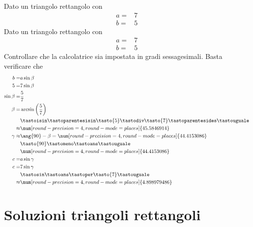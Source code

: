 \begin{exercise}
	Dato un triangolo rettangolo con
	\begin{align*}
	a=&7\\
	b=&5
	\end{align*}
	\tcblower
		Dato un triangolo rettangolo con
	\begin{align*}
	a=&7\\
	b=&5
	\end{align*}
	Controllare che la calcolatrice sia impostata in gradi sessagesimali.
	Basta verificare che \testgradi 
	\begin{align*}
	b=&a\sin\beta\\
	5=&7\sin\beta\\
	\sin\beta=&\dfrac{5}{7}\\
	\beta=&\arcsin\left(\dfrac{5}{7}\right)\\
	&\tastoisin\tastoparentesisin\tasto{5}\tastodiv\tasto{7}\tastoparentesides\tastouguale\\
	\approx&\num[round-precision=\lungarrotandamento,round-mode=places]{45.5846914}\\
	\gamma\approx&\ang{90}-\beta=\num[round-precision=\lungarrotandamento,round-mode=places]{44.4153086}\\
	&\tasto{90}\tastomeno\tastoans\tastouguale\\
	&\num[round-precision=\lungarrotandamento,round-mode=places]{44.4153086}\\
	c=&a\sin\gamma\\
	c=&7\sin\gamma\\
	&\tastosin\tastoans\tastoper\tasto{7}\tastouguale\\
	\approx&\num[round-precision=\lungarrotandamento,round-mode=places]{4.898979486}\\
	\end{align*}
\end{exercise}
\tcbstoprecording
 \newpage
 \section{Soluzioni triangoli rettangoli}
 \tcbinputrecords